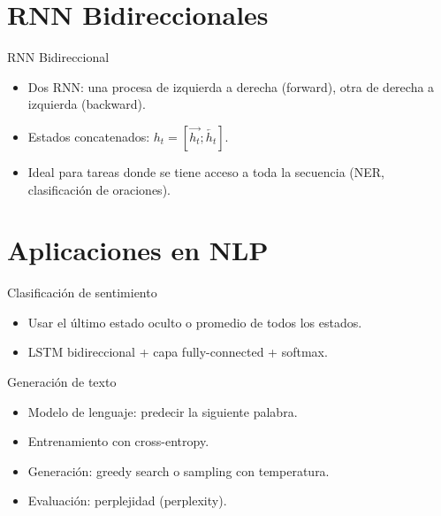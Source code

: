 \documentclass[aspectratio=169, 10pt, xcolor=table]{beamer}
\begin{document}
\section{RNN Bidireccionales}

\begin{frame}{RNN Bidireccional}
    \begin{itemize}
        \item Dos RNN: una procesa de izquierda a derecha (forward), otra de derecha a izquierda (backward).
        \item Estados concatenados: $h_t = [\overrightarrow{h_t}; \overleftarrow{h_t}]$.
        \item Ideal para tareas donde se tiene acceso a toda la secuencia (NER, clasificación de oraciones).
    \end{itemize}
\end{frame}

\section{Aplicaciones en NLP}

\begin{frame}{Clasificación de sentimiento}
    \begin{itemize}
        \item Usar el último estado oculto o promedio de todos los estados.
        \item LSTM bidireccional + capa fully-connected + softmax.
    \end{itemize}
\end{frame}

\begin{frame}{Generación de texto}
    \begin{itemize}
        \item Modelo de lenguaje: predecir la siguiente palabra.
        \item Entrenamiento con cross-entropy.
        \item Generación: greedy search o sampling con temperatura.
        \item Evaluación: perplejidad (perplexity).
    \end{itemize}
\end{frame}
\end{document}
